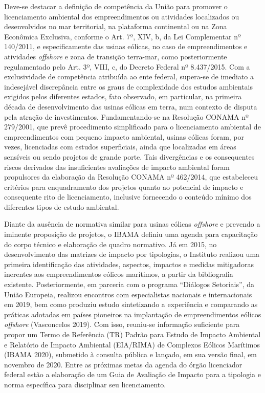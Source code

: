\documentclass[
  oneside]{scrbook}
\begin{document}
Deve-se destacar a definição de competência da União para promover o licenciamento ambiental dos empreendimentos ou atividades localizados ou desenvolvidos no mar territorial, na plataforma continental ou na Zona Econômica Exclusiva, conforme o Art. 7º, XIV, b, da Lei Complementar nº 140/2011, e especificamente das usinas eólicas, no caso de empreendimentos e atividades \emph{offshore} e zona de transição terra-mar, como posteriormente regulamentado pelo Art. 3º, VIII, c, do Decreto Federal nº 8.437/2015. Com a exclusividade de competência atribuída ao ente federal, supera-se de imediato a indesejável discrepância entre os graus de complexidade dos estudos ambientais exigidos pelos diferentes estados, fato observado, em particular, na primeira década de desenvolvimento das usinas eólicas em terra, num contexto de disputa pela atração de investimentos. Fundamentando-se na Resolução CONAMA nº 279/2001, que prevê procedimento simplificado para o licenciamento ambiental de empreendimentos com pequeno impacto ambiental, usinas eólicas foram, por vezes, licenciadas com estudos superficiais, ainda que localizadas em áreas sensíveis ou sendo projetos de grande porte. Tais divergências e os consequentes riscos derivados das insuficientes avaliações de impacto ambiental foram propulsores da elaboração da Resolução CONAMA nº 462/2014, que estabeleceu critérios para enquadramento dos projetos quanto ao potencial de impacto e consequente rito de licenciamento, inclusive fornecendo o conteúdo mínimo dos diferentes tipos de estudo ambiental.

Diante da ausência de normativa similar para usinas eólicas \emph{offshore} e prevendo a iminente proposição de projetos, o IBAMA definiu uma agenda para capacitação do corpo técnico e elaboração de quadro normativo. Já em 2015, no desenvolvimento das matrizes de impacto por tipologias, o Instituto realizou uma primeira identificação das atividades, aspectos, impactos e medidas mitigadoras inerentes aos empreendimentos eólicos marítimos, a partir da bibliografia existente. Posteriormente, em parceria com o programa ``Diálogos Setoriais'', da União Europeia, realizou encontros com especialistas nacionais e internacionais em 2019, bem como produziu estudo sintetizando a experiência e comparando as práticas adotadas em países pioneiros na implantação de empreendimentos eólicos \emph{offshore} (Vasconcelos 2019). Com isso, reuniu-se informação suficiente para propor um Termo de Referência (TR) Padrão para Estudo de Impacto Ambiental e Relatório de Impacto Ambiental (EIA/RIMA) de Complexos Eólicos Marítimos (IBAMA 2020), submetido à consulta pública e lançado, em sua versão final, em novembro de 2020. Entre as próximas metas da agenda do órgão licenciador federal estão a elaboração de um Guia de Avaliação de Impacto para a tipologia e norma específica para disciplinar seu licenciamento.
\end{document}
